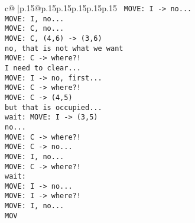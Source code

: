 \documentclass{article}
\begin{document}
{\begin{supertabular}{c@{$\;$}|p{.15\linewidth}@{}p{.15\linewidth}p{.15\linewidth}p{.15\linewidth}p{.15\linewidth}p{.15\linewidth}}
{{{\ \tt  MOVE: I -> no...\\ \tt  MOVE: I, no...\\ \tt  MOVE: C, no... \\ \tt  MOVE: C, (4,6) -> (3,6) \\ \tt  no, that is not what we want\\ \tt  MOVE: C -> where?!\\ \tt  I need to clear...\\ \tt  MOVE: I -> no, first...\\ \tt  MOVE: C -> where?!\\ \tt  MOVE: C -> (4,5) \\ \tt  but that is occupied...\\ \tt  wait: MOVE: I -> (3,5) \\ \tt  no... \\ \tt  MOVE: C -> where?!\\ \tt  MOVE: C -> no...\\ \tt  MOVE: I, no...\\ \tt  MOVE: C -> where?!\\ \tt  wait: \\ \tt  MOVE: I -> no...\\ \tt  MOVE: I -> where?!\\ \tt  MOVE: I, no...\\ \tt  MOV}}}
\end{supertabular}}
\end{document}
